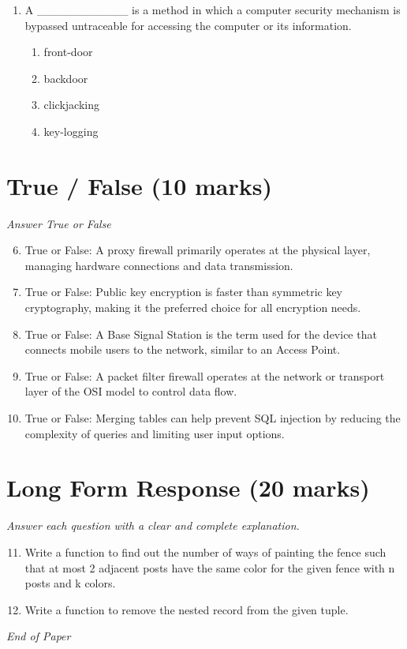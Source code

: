 \documentclass[12pt]{article}
\begin{document}
\begin{enumerate}[label=\arabic*.]
\begin{enumerate}[label=(\alph*)]
    \item wireless handshaking
\end{enumerate}
\item A \_\_\_\_\_\_\_\_\_\_\_ is a method in which a computer security mechanism is bypassed untraceable for accessing the computer or its information.
\begin{enumerate}[label=(\alph*)]
    \item front-door
    \item backdoor
    \item clickjacking
    \item key-logging
\end{enumerate}
\end{enumerate}

\section*{True / False (10 marks)}
\textit{Answer True or False}
\begin{enumerate}[label=\arabic*.]
\setcounter{enumi}{5}
\item True or False: A proxy firewall primarily operates at the physical layer, managing hardware connections and data transmission.
\item True or False: Public key encryption is faster than symmetric key cryptography, making it the preferred choice for all encryption needs.
\item True or False: A Base Signal Station is the term used for the device that connects mobile users to the network, similar to an Access Point.
\item True or False: A packet filter firewall operates at the network or transport layer of the OSI model to control data flow.
\item True or False: Merging tables can help prevent SQL injection by reducing the complexity of queries and limiting user input options.
\end{enumerate}

\section*{Long Form Response (20 marks)}
\textit{Answer each question with a clear and complete explanation.}
\begin{enumerate}[label=\arabic*.]
\setcounter{enumi}{10}
\item Write a function to find out the number of ways of painting the fence such that at most 2 adjacent posts have the same color for the given fence with n posts and k colors.
\item Write a function to remove the nested record from the given tuple.
\end{enumerate}

\vfill
\noindent\textit{End of Paper}
\end{document}
